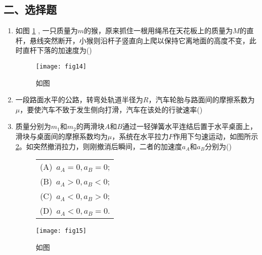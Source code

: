 \subsection*{二、选择题}
\begin{enumerate}
    \item  如图 \ref{fig:14} , 一只质量为$m$的猴，原来抓住一根用绳吊在天花板上的质量为$M$的直杆，悬线突然断开，小猴则沿杆子竖直向上爬以保持它离地面的高度不变，此时直杆下落的加速度为(\hspace{1pc})
    \begin{figure}[ht]
        \centering
        \texttt{[image: fig14]}
            \caption{如图}\label{fig:14}
    \end{figure}
    \item 一段路面水平的公路，转弯处轨道半径为$R$，汽车轮胎与路面间的摩擦系数为$\mu$，要使汽车不致于发生侧向打滑，汽车在该处的行驶速率(\hspace{1pc})
    \item 质量分别为$m_1$和$m_2$的两滑块$A$和$B$通过一轻弹簧水平连结后置于水平桌面上，滑块与桌面间的摩擦系数均为$\mu$，系统在水平拉力$F$作用下匀速运动，如图所示\ref{fig:15}。如突然撤消拉力，则刚撤消后瞬间，二者的加速度$a_A$和$a_B$分别为(\hspace{1pc}) 
    \begin{figure}[ht]
        \begin{minipage}[ht]{0.4\linewidth}
           \begin{table}[H]
               \begin{tabular}{c}
                  \qquad   (A)\ $a_A=0, a_B=0$;\\
                  \qquad  (B)\ $a_A>0, a_B<0$;\\
                  \qquad  (C)\ $a_A<0, a_B>0$;\\
                  \qquad  (D)\ $a_A<0, a_B=0$.
               \end{tabular}
           \end{table}
        \end{minipage}
        \begin{minipage}[h]{0.5\linewidth}
            \texttt{[image: fig15]}
            \caption{如图}\label{fig:15}
        \end{minipage}
    \end{figure}
\end{enumerate}
